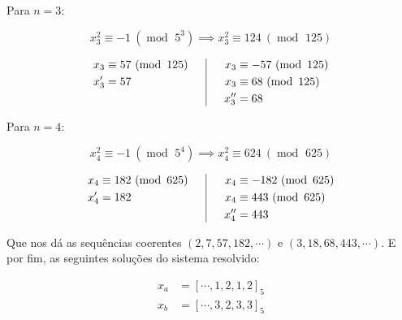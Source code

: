 \documentclass{report}
\newcommand*{\padc}[2]{\left[#1\right]_{#2}}
\DeclareMathOperator{\modulo}{mod \ }
\theoremstyle{definition}
\begin{document}
Para $n = 3$:

\begin{equation*}
    x_3^2 \equiv -1 \ (\modulo 5^3) \implies x_3^2 \equiv 124 \ (\modulo 125)
\end{equation*}

\begin{equation*}
    \begin{aligned}[c]
        x_3 &\equiv 57 \ (\modulo 125)\\
        x'_3 &= 57\\
        \hphantom{0}
    \end{aligned}
    \hphantom{OO}\vline\hphantom{OO}
    \begin{aligned}[c]
        x_3 &\equiv -57 \ (\modulo 125)\\
        x_3 &\equiv 68 \ (\modulo 125)\\
        x''_3 &= 68
    \end{aligned}
\end{equation*}

Para $n = 4$:

\begin{equation*}
    x_4^2 \equiv -1 \ (\modulo 5^4) \implies x_4^2 \equiv 624 \ (\modulo 625)
\end{equation*}

\begin{equation*}
    \begin{aligned}[c]
        x_4 &\equiv 182 \ (\modulo 625)\\
        x'_4 &= 182\\
        \hphantom{0}
    \end{aligned}
    \hphantom{OO}\vline\hphantom{OO}
    \begin{aligned}[c]
        x_4 &\equiv -182 \ (\modulo 625)\\
        x_4 &\equiv 443 \ (\modulo 625)\\
        x''_4 &= 443
    \end{aligned}
\end{equation*}

\smallskip

Que nos dá as sequências coerentes $(2, 7, 57, 182,\cdots)$ e $(3, 18, 68, 443,\cdots)$. E por fim, as seguintes soluções do sistema resolvido:

\begin{align*}
    x_a &= \padc{\cdots, 1,2,1,2}{5} \\
    x_b &= \padc{\cdots, 3,2,3,3}{5}
\end{align*}
\end{document}
